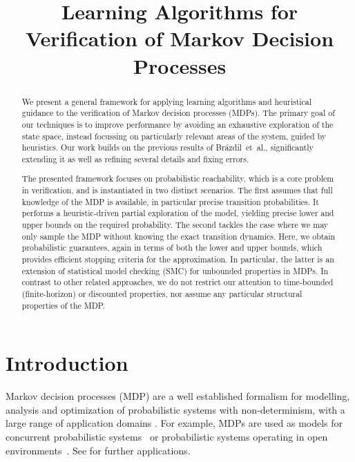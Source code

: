 \documentclass{theoretics}
\title{Learning Algorithms for Verification of Markov Decision Processes}
\begin{document}
	\maketitle
	
	\begin{abstract}
		We present a general framework for applying learning algorithms and heuristical guidance to the verification of Markov decision processes (MDPs).
The primary goal of our techniques is to improve performance by avoiding an exhaustive exploration of the state space, instead focussing on particularly relevant areas of the system, guided by heuristics.
Our work builds on the previous results of Br{\'{a}}zdil~et~al., significantly extending it as well as refining several details and fixing errors.

The presented framework focuses on probabilistic reachability, which is a core problem in verification, and is instantiated in two distinct scenarios.
The first assumes that full knowledge of the MDP is available, in particular precise transition probabilities.
It performs a heuristic-driven partial exploration of the model, yielding precise lower and upper bounds on the required probability.
The second tackles the case where we may only sample the MDP without knowing the exact transition dynamics.
Here, we obtain probabilistic guarantees, again in terms of both the lower and upper bounds, which provides efficient stopping criteria for the approximation.
In particular, the latter is an extension of statistical model checking (SMC) for unbounded properties in MDPs.
In contrast to other related approaches, we do not restrict our attention to time-bounded (finite-horizon) or discounted properties, nor assume any particular structural properties of the MDP.
	\end{abstract}



	\section{Introduction} \label{sec:introduction}


Markov decision processes (MDP) \cite{howard1960dynamic,filar1996competitive,DBLP:books/wi/Puterman94} are a well established formalism for modelling, analysis and optimization of probabilistic systems with non-determinism, with a large range of application domains \cite{DBLP:books/daglib/0020348,DBLP:conf/cav/KwiatkowskaNP11}.
For example, MDPs are used as models for concurrent probabilistic systems~\cite{DBLP:journals/jacm/CourcoubetisY95} or probabilistic systems operating in open environments~\cite{segala1996modeling}.
See \cite{white1985real,white1988further,white1993survey} for further applications.
\end{document}
